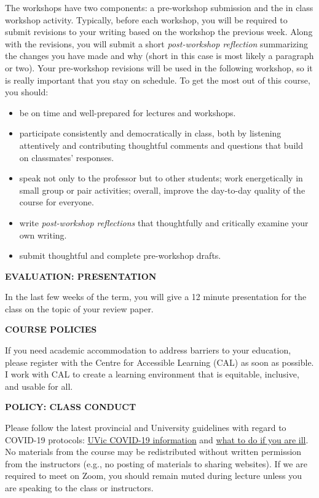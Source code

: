 \documentclass[11pt]{article}
\begin{document}
The workshops have two components: a pre-workshop submission and the in class workshop activity. Typically, before each workshop, you will be required to submit revisions to your writing based on the workshop the previous week. Along with the revisions, you will submit a short \emph{post-workshop reflection} summarizing the changes you have made and why (short in this case is most likely a paragraph or two). Your pre-workshop revisions will be used in the following workshop, so it is really important that you stay on schedule.
To get the most out of this course, you should:
\begin{itemize}
	\setlength\itemsep{0em}
	\item be on time and well-prepared for lectures and workshops.
	\item participate consistently and democratically in class, both by listening attentively
	      and contributing thoughtful comments and questions that build on classmates'
	      responses.
	\item speak not only to the professor but to other students; work energetically in small group or pair activities; overall, improve the day-to-day quality of the course for everyone.
	\item write \emph{post-workshop reflections} that thoughtfully and critically examine your own writing.
	\item submit thoughtful and complete pre-workshop drafts.
\end{itemize}

\textbf{EVALUATION: PRESENTATION}

In the last few weeks of the term, you will give a 12 minute presentation for the class on the topic of your review paper.

\begin{center}
	\textbf{COURSE POLICIES}
\end{center}

If you need academic accommodation to address barriers to your education, please register with the Centre for Accessible Learning (CAL) as soon as possible. I work with CAL to create a learning environment that is equitable, inclusive, and usable for all.

\textbf{POLICY: CLASS CONDUCT}

Please follow the latest provincial and University guidelines with regard to COVID-19 protocols: \href{https://www.uvic.ca/covid19/index.php}{UVic COVID-19 information} and \href{https://www.uvic.ca/covid19/health-safety/index.php#ipn-if-you-re-sick}{what to do if you are ill}. No materials from the course may be redistributed without written permission from the instructors (e.g., no posting of materials to sharing websites). If we are required to meet on Zoom, you should remain muted during lecture unless you are speaking to the class or instructors.
\end{document}
